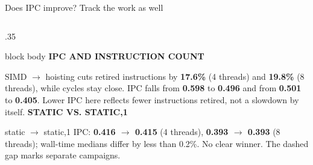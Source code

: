 \documentclass[aspectratio=169,10pt]{beamer}
\newcommand{\smallmuted}[1]{{\color{muted}\small #1}}
\newcommand{\cardtitle}[2]{%
  {\color{#1}\bfseries\small #2}\par\vspace{.08cm}}
\begin{document}
\begin{frame}{Does IPC improve? Track the work as well}
\begin{columns}[T,onlytextwidth]
\begin{column}{.35\textwidth}
\begin{beamercolorbox}[rounded=true,sep=.18cm,wd=\textwidth]{block body}
        \cardtitle{coral}{IPC AND INSTRUCTION COUNT}
        \footnotesize SIMD $\to$ hoisting cuts retired instructions by
        \textbf{17.6\%} (4 threads) and \textbf{19.8\%} (8 threads), while
        cycles stay close. IPC falls from \textbf{0.598} to \textbf{0.496}
        and from \textbf{0.501} to \textbf{0.405}.
        \smallmuted{Lower IPC here reflects fewer instructions retired, not
        a slowdown by itself.}
        \vspace{.08cm}
        \cardtitle{mint}{STATIC VS. STATIC,1}
        \footnotesize static $\to$ static,1 IPC: \textbf{0.416 $\to$ 0.415} (4 threads),
        \textbf{0.393 $\to$ 0.393} (8 threads); wall-time medians differ by
        less than 0.2\%. No clear winner. \smallmuted{The dashed gap marks
        separate campaigns.}
      \end{beamercolorbox}
    \end{column}
  \end{columns}
\end{frame}
\end{document}
